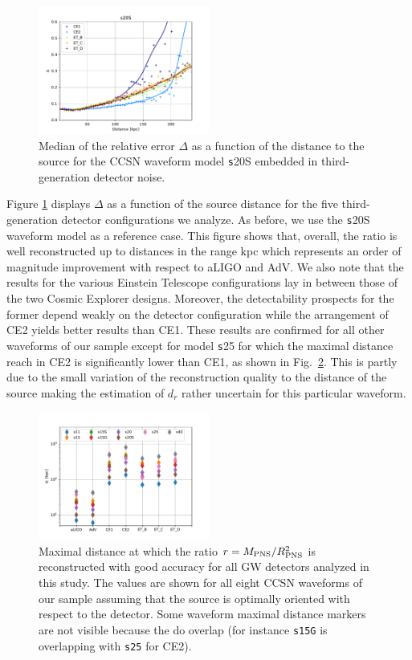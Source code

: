 \begin{figure}[t]
  \centering
  \includegraphics[width=0.5\textwidth]{plots/s20--SFHo_all3G}
  \caption{Median of the relative error $\Delta$ as a function of the  distance to the source for the CCSN waveform model {\texttt s20S} embedded in third-generation detector noise.}
  \label{fig:s20--SFHo_all3G}
\end{figure}

Figure \ref{fig:s20--SFHo_all3G} displays $\Delta$ as a function of the source distance for the five third-generation detector configurations we analyze. As before, we use the {\texttt s20S} waveform model as a reference case.  This figure shows that,  overall, the ratio is well reconstructed up to distances in the range \unit[100--200]{kpc} which represents an order of magnitude improvement with respect to aLIGO and AdV. We also note that the results for the various Einstein Telescope configurations lay in between those of the two Cosmic Explorer designs. Moreover,  the detectability prospects for the former depend weakly on the detector configuration while the arrangement of CE2 yields better results than CE1. These results are confirmed for all other waveforms of our sample except for model {\texttt s25} for which the maximal distance reach in CE2 is significantly lower than CE1, as shown in Fig.~\ref{fig:distances}. This is partly due to the small variation of the reconstruction quality to the distance of the source making the estimation of $d_r$ rather uncertain for this particular waveform. 

\begin{figure}[t]
  \centering
  \includegraphics[width=0.5\textwidth]{plots/dist_allwvfs_2G3G}
  \caption{Maximal distance at which the ratio $r=M_{\rm PNS}/R_{\rm PNS}^2$ is reconstructed
    with good accuracy for all GW detectors analyzed in this study. The values are shown for all eight CCSN waveforms of our sample assuming that the source is optimally oriented with respect to the detector. Some waveform maximal distance markers are not visible because the do overlap (for instance \texttt{s15G} is overlapping with \texttt{s25} for CE2).} 
\label{fig:distances}
\end{figure}

